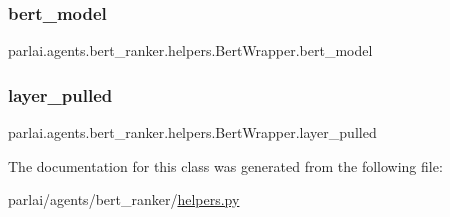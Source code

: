 \subsubsection{\texorpdfstring{bert\+\_\+model}{bert\_model}}
{\footnotesize\ttfamily parlai.\+agents.\+bert\+\_\+ranker.\+helpers.\+Bert\+Wrapper.\+bert\+\_\+model}

\mbox{\label{classparlai_1_1agents_1_1bert__ranker_1_1helpers_1_1BertWrapper_a9223033165d667d6449fdc463d268fe4}} 
\subsubsection{\texorpdfstring{layer\+\_\+pulled}{layer\_pulled}}
{\footnotesize\ttfamily parlai.\+agents.\+bert\+\_\+ranker.\+helpers.\+Bert\+Wrapper.\+layer\+\_\+pulled}



The documentation for this class was generated from the following file\+:\begin{DoxyCompactItemize}
\item 
parlai/agents/bert\+\_\+ranker/\hyperlink{helpers_8py}{helpers.\+py}\end{DoxyCompactItemize}

